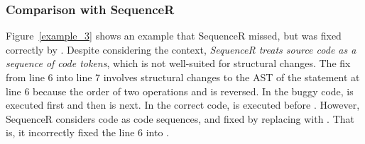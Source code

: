 \subsubsection{\bf Comparison with SequenceR}


Figure~\ref{example_3} shows an example that SequenceR missed, but was
fixed correctly by {\tool}. Despite considering the context, {\em
  SequenceR treats source code as a sequence of code tokens}, which is
not well-suited for structural changes. The fix from line 6 into line
7 involves structural changes to the AST of the statement at line 6
because the order of two operations  and \code{\%} is
reversed. In the buggy code,  is executed first and then
\code{\%} is next. In the correct code, \code{\%} is executed before
.
However, SequenceR considers code as code sequences,
and fixed by replacing  with . That is, it incorrectly fixed the line 6 into
   
\code{\%} .


